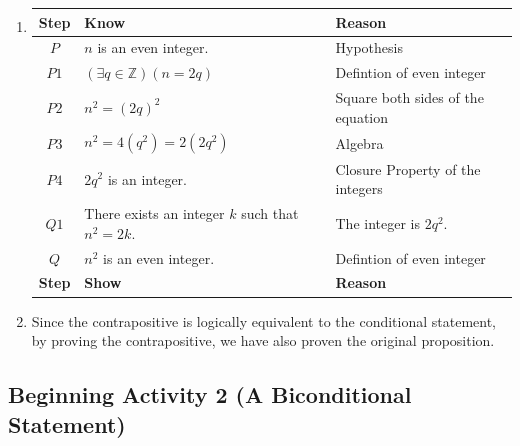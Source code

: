 \documentclass[11pt]{article}
\begin{document}
\begin{enumerate}
\item 
\begin{tabular}[t]{| c | l | l |} \hline
\textbf{Step} & \textbf{Know} & \textbf{Reason} \\ \hline
$P$  &  $n$  is an even integer.  & Hypothesis \\ \hline
$P1$  &  $( {\exists q \in \mathbb{Z}} )( {n = 2q} )$ & Defintion of even integer \\ \hline
$P2$  &  $n^2  = ( {2q} )^2 $ &  Square both sides of the equation \\ \hline
$P3$  &  $n^2 = 4 ( q^2 ) = 2 ( 2q^2 ) $  &  Algebra \\ \hline
$P4$  &  $2q^2$ is an integer.  &  Closure Property of the integers \\ \hline
$Q1$  &  There exists an integer $k$ such that $n^2 = 2k$.  &  The integer is $2q^2$. \\ \hline
$Q$   &  $n^2$ is an even integer.  &  Defintion of even integer \\ \hline
\textbf{Step} & \textbf{Show} & \textbf{Reason} \\ \hline
\end{tabular}

\item Since the contrapositive is logically equivalent to the conditional statement, by proving the contrapositive, we have also proven the original proposition.

\end{enumerate}
\hbreak



\newpage
\subsection*{\textbf{Beginning Activity 2 (A Biconditional Statement)}}
\end{document}
